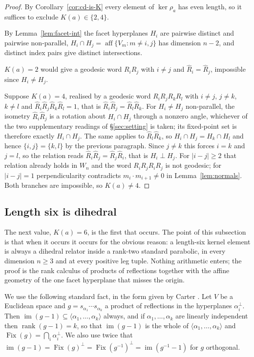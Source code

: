 \documentclass[11pt,a4paper]{article}
\theoremstyle{definition}
\theoremstyle{remark}
\theoremstyle{plain}
\begin{document}
\begin{proof}
By Corollary~\ref{cor:cd-is-K} every element of $\ker\rho_a$ has even length, so it suffices to
exclude $K(a)\in\{2,4\}$.

By Lemma~\ref{lem:facet-int} the facet hyperplanes $H_i$ are pairwise distinct and pairwise
non-parallel, $H_i\cap H_j=\operatorname{aff}\{V_m:m\ne i,j\}$ has dimension $n-2$, and
distinct index pairs give distinct intersections.

$K(a)=2$ would give a geodesic word $R_iR_j$ with $i\ne j$ and
$\widehat R_i=\widehat R_j$, impossible since $H_i\ne H_j$.

Suppose $K(a)=4$, realised by a geodesic word $R_iR_jR_kR_l$ with $i\ne j$, $j\ne k$, $k\ne l$
and $\widehat R_i\widehat R_j\widehat R_k\widehat R_l=1$, that is
$\widehat R_i\widehat R_j=\widehat R_l\widehat R_k$. For $H_i\ne H_j$ non-parallel, the isometry
$\widehat R_i\widehat R_j$ is a rotation about $H_i\cap H_j$ through a nonzero angle, whichever
of the two supplementary readings of \S\ref{sec:setting} is taken; its fixed-point set is
therefore exactly $H_i\cap H_j$. The
same applies to $\widehat R_l\widehat R_k$, so $H_i\cap H_j=H_k\cap H_l$ and hence
$\{i,j\}=\{k,l\}$ by the previous paragraph. Since $j\ne k$ this forces $i=k$ and $j=l$, so the
relation reads $\widehat R_i\widehat R_j=\widehat R_j\widehat R_i$, that is $H_i\perp H_j$. For
$|i-j|\ge2$ that relation already holds in $W_n$ and the word $R_iR_jR_iR_j$ is not geodesic;
for $|i-j|=1$ perpendicularity contradicts $m_i\cdot m_{i+1}\ne0$ in
Lemma~\ref{lem:normals}. Both branches are impossible, so $K(a)\ne4$.
\end{proof}

\subsection{Length six is dihedral}\label{subsec:len6}

The next value, $K(a)=6$, is the first that occurs. The point of this subsection is that when
it occurs it occurs for the obvious reason: a length-six kernel element is always a dihedral
relator inside a rank-two standard parabolic, in every dimension $n\ge3$ and at every positive
leg tuple. Nothing arithmetic enters; the proof is the rank calculus of products of reflections
together with the affine geometry of the one facet hyperplane that misses the origin.

We use the following standard fact, in the form given by Carter \cite[Lemma 2]{carter}. Let
$V$ be a Euclidean space and $g=s_{\alpha_1}\cdots s_{\alpha_k}$ a product of reflections in
the hyperplanes $\alpha_i^{\perp}$. Then $\operatorname{im}(g-1)\subseteq
\langle\alpha_1,\dots,\alpha_k\rangle$ always, and if $\alpha_1,\dots,\alpha_k$ are linearly
independent then $\operatorname{rank}(g-1)=k$, so that $\operatorname{im}(g-1)$ is the whole of
$\langle\alpha_1,\dots,\alpha_k\rangle$ and $\operatorname{Fix}(g)=\bigcap_i\alpha_i^{\perp}$.
We also use twice that $\operatorname{im}(g-1)=\operatorname{Fix}(g)^{\perp}=
\operatorname{Fix}(g^{-1})^{\perp}=\operatorname{im}(g^{-1}-1)$ for $g$ orthogonal.
\end{document}
